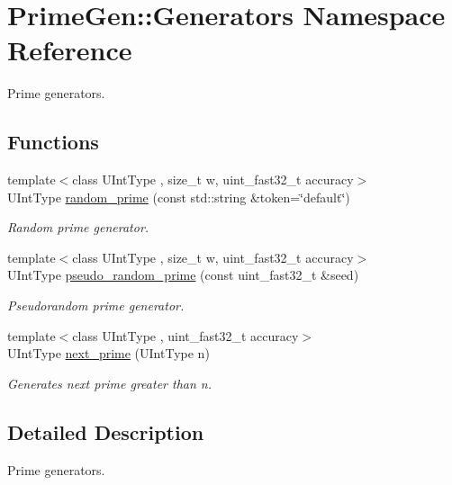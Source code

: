 \hypertarget{namespace_prime_gen_1_1_generators}{\section{Prime\-Gen\-:\-:Generators Namespace Reference}
\label{namespace_prime_gen_1_1_generators}
}


Prime generators.  


\subsection*{Functions}
\begin{DoxyCompactItemize}
\item 
{\footnotesize template$<$class U\-Int\-Type , size\-\_\-t w, uint\-\_\-fast32\-\_\-t accuracy$>$ }\\U\-Int\-Type \hyperlink{namespace_prime_gen_1_1_generators_a8a8f4b71177d1af319d557d752a5f5f2}{random\-\_\-prime} (const std\-::string \&token=\char`\"{}default\char`\"{})
\begin{DoxyCompactList}\small\item\em Random prime generator. \end{DoxyCompactList}\item 
{\footnotesize template$<$class U\-Int\-Type , size\-\_\-t w, uint\-\_\-fast32\-\_\-t accuracy$>$ }\\U\-Int\-Type \hyperlink{namespace_prime_gen_1_1_generators_ad1e01a21e488dd5c0b668e972238ec6b}{pseudo\-\_\-random\-\_\-prime} (const uint\-\_\-fast32\-\_\-t \&seed)
\begin{DoxyCompactList}\small\item\em Pseudorandom prime generator. \end{DoxyCompactList}\item 
{\footnotesize template$<$class U\-Int\-Type , uint\-\_\-fast32\-\_\-t accuracy$>$ }\\U\-Int\-Type \hyperlink{namespace_prime_gen_1_1_generators_a873d71df2a6aa5006ef2be655b0e96bd}{next\-\_\-prime} (U\-Int\-Type n)
\begin{DoxyCompactList}\small\item\em Generates next prime greater than {\ttfamily n}. \end{DoxyCompactList}\end{DoxyCompactItemize}


\subsection{Detailed Description}
Prime generators. 

